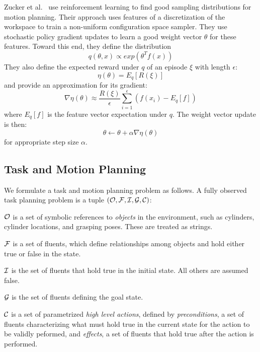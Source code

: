Zucker et al.~\cite{workspacebias} use reinforcement learning to find good sampling distributions
for motion planning. Their approach uses features of a discretization of the workspace to train
a non-uniform configuration space sampler. They use stochastic policy gradient updates to learn a good weight
vector $\theta$ for these features. Toward this end, they define the distribution
\begin{equation}
q(\theta, x) \propto exp(\theta^{T} f(x))
\end{equation}
They also define the expected reward under $q$ of an episode $\xi$ with length $\epsilon$:
\begin{equation}
\eta(\theta) = E_{q}[R(\xi)]
\end{equation}
and provide an approximation for its gradient:
\begin{equation}
\nabla \eta(\theta) \approx \frac{R(\xi)}{\epsilon} \sum_{i=1}^{\epsilon}(f(x_{i}) - E_{q}[f])
\end{equation}
where $E_{q}[f]$ is the feature vector expectation under $q$. The weight vector update is then:
\begin{equation}
\theta \leftarrow \theta + \alpha \nabla \eta(\theta)
\end{equation}
for appropriate step size $\alpha$.

\subsection{Task and Motion Planning}
We formulate a task and motion planning problem as follows. A fully observed task planning
problem is a tuple $(\mathcal{O}, \mathcal{F}, \mathcal{I}, \mathcal{G}, \mathcal{C})$:

$\mathcal{O}$ is a set of symbolic references to \emph{objects} in the environment,
such as cylinders, cylinder locations, and grasping poses. These are treated as strings.

$\mathcal{F}$ is a set of fluents, which define relationships among objects and hold either
true or false in the state.

$\mathcal{I}$ is the set of fluents that hold true in the initial state. All others are assumed false.

$\mathcal{G}$ is the set of fluents defining the goal state.

$\mathcal{C}$ is a set of parametrized \emph{high level actions}, defined by \emph{preconditions}, a set
of fluents characterizing what must hold true in the current state for the action
to be validly peformed, and \emph{effects}, a set of fluents that hold true after
the action is performed.

